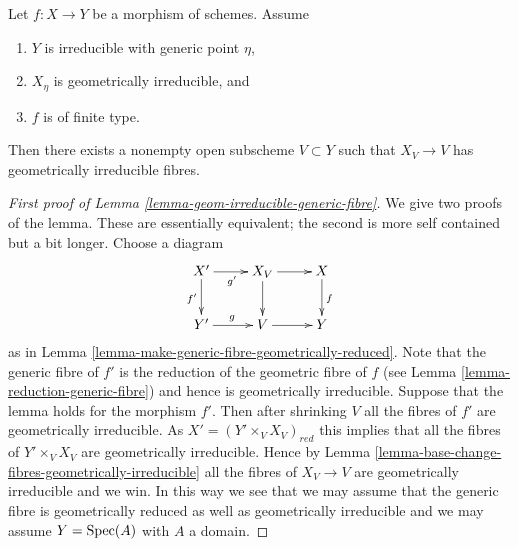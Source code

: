 \begin{lemma}
\label{lemma-geom-irreducible-generic-fibre}
Let $f : X \to Y$ be a morphism of schemes.
Assume
\begin{enumerate}
\item $Y$ is irreducible with generic point $\eta$,
\item $X_\eta$ is geometrically irreducible, and
\item $f$ is of finite type.
\end{enumerate}
Then there exists a nonempty open subscheme $V \subset Y$
such that $X_V \to V$ has geometrically irreducible fibres.
\end{lemma}

\begin{proof}[First proof of Lemma \ref{lemma-geom-irreducible-generic-fibre}]
We give two proofs of the lemma. These are essentially equivalent;
the second is more self contained but a bit longer.
Choose a diagram
$$
\xymatrix{
X' \ar[d]_{f'} \ar[r]_{g'} & X_V \ar[r] \ar[d] & X \ar[d]^f \\
Y' \ar[r]^g & V \ar[r] & Y
}
$$
as in
Lemma \ref{lemma-make-generic-fibre-geometrically-reduced}.
Note that the generic fibre of $f'$ is the reduction of the
geometric fibre of $f$ (see
Lemma \ref{lemma-reduction-generic-fibre})
and hence is geometrically irreducible.
Suppose that the lemma holds for the morphism $f'$. Then after shrinking
$V$ all the fibres of $f'$ are geometrically irreducible.
As $X' = (Y' \times_V X_V)_{red}$ this implies that all the fibres
of $Y' \times_V X_V$ are geometrically irreducible. Hence by
Lemma \ref{lemma-base-change-fibres-geometrically-irreducible}
all the fibres of $X_V \to V$ are geometrically irreducible and
we win. In this way we see that we may assume that the generic
fibre is geometrically reduced as well as geometrically irreducible
and we may assume $Y = \mathop{\rm Spec}(A)$ with $A$ a domain.


\end{proof}
